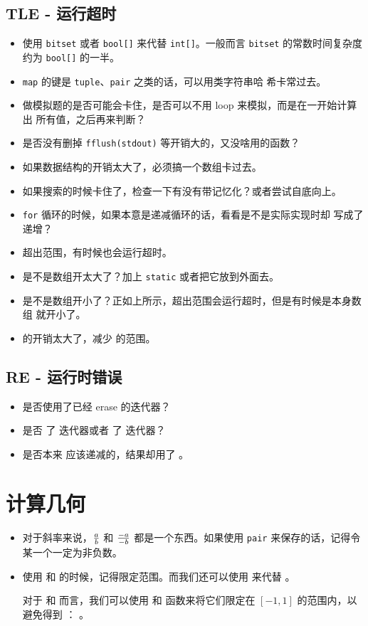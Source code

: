 \subsection{TLE - 运行超时}
\begin{itemize}
    \item 使用 \verb|bitset| 或者 \verb|bool[]| 来代替 \verb|int[]|。一般而言
        \verb|bitset| 的常数时间复杂度约为 \verb|bool[]| 的一半。
    \item \verb|map| 的键是 \verb|tuple|、\verb|pair| 之类的话，可以用类字符串哈
        希卡常过去。
    \item 做模拟题的是否可能会卡住，是否可以不用 loop 来模拟，而是在一开始计算出
        所有值，之后再来判断？
    \item 是否没有删掉 \verb|fflush(stdout)| 等开销大的，又没啥用的函数？
    \item 如果数据结构的开销太大了，必须搞一个数组卡过去。
    \item 如果搜索的时候卡住了，检查一下有没有带记忆化？或者尝试自底向上。
    \item \verb|for| 循环的时候，如果本意是递减循环的话，看看是不是实际实现时却
        写成了递增？
    \item 超出范围，有时候也会运行超时。
    \item 是不是数组开太大了？加上 \verb|static| 或者把它放到外面去。
    \item 是不是数组开小了？正如上所示，超出范围会运行超时，但是有时候是本身数组
        就开小了。
    \item {} 的开销太大了，减少  的范围。
\end{itemize}



\subsection{RE - 运行时错误}
\begin{itemize}
    \item 是否使用了已经 erase 的迭代器？
    \item 是否 \cmd{--} 了  迭代器或者 \cmd{++} 了  迭代器？
    \item 是否本来  应该递减的，结果却用了 。
\end{itemize}





\section{计算几何}
\begin{itemize}
    \item 对于斜率来说，$a \over b$ 和 $-a \over -b$ 都是一个东西。如果使用
        \verb|pair| 来保存的话，记得令某一个一定为非负数。
    \item 使用  和  的时候，记得限定范围。而我们还可以使用
         来代替 。

        对于  和  而言，我们可以使用  和 
        函数来将它们限定在 $[-1, 1]$ 的范围内，以避免得到 ：
        。
\end{itemize}
